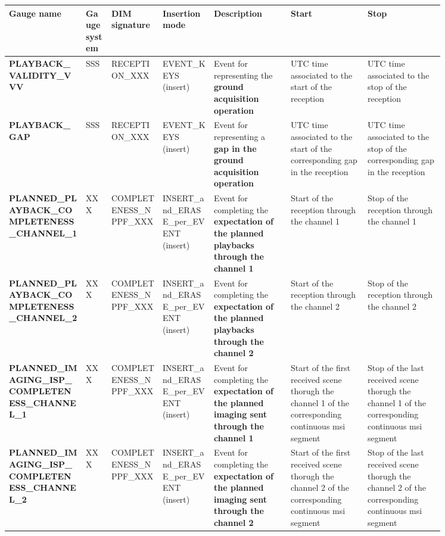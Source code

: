 \begin{landscape}
\begin{longtable}{|M{0.15\linewidth}|M{0.05\linewidth}|M{0.10\linewidth}|M{0.10\linewidth}|M{0.15\linewidth}|M{0.15\linewidth}|M{0.15\linewidth}|}
\hline \textbf{Gauge name} & \textbf{Gauge system} & \textbf{DIM signature} & \textbf{Insertion mode} & \textbf{Description} & \textbf{Start} & \textbf{Stop} \\ \hline
\textbf{PLAYBACK\_VALIDITY\_VVV} & SSS & \- RECEPTION\_XXX & EVENT\_KEYS (insert) & Event for representing the \textbf{ground acquisition operation} & UTC time associated to the start of the reception & UTC time associated to the stop of the reception \\ \hline
\textbf{PLAYBACK\_GAP} & SSS & \- RECEPTION\_XXX & EVENT\_KEYS (insert) & Event for representing a \textbf{gap in the ground acquisition operation} & UTC time associated to the start of the corresponding gap in the reception & UTC time associated to the stop of the corresponding gap in the reception \\ \hline
\textbf{PLANNED\_PLAYBACK\_COMPLETENESS\_CHANNEL\_1} & XXX & \- COMPLETENESS\_NPPF\_XXX & INSERT\_and\_ERASE\_per\_EVENT (insert) & Event for completing the \textbf{expectation of the planned playbacks through the channel 1} & Start of the reception through the channel 1 & Stop of the reception through the channel 1 \\ \hline
\textbf{PLANNED\_PLAYBACK\_COMPLETENESS\_CHANNEL\_2} & XXX & \- COMPLETENESS\_NPPF\_XXX & INSERT\_and\_ERASE\_per\_EVENT (insert) & Event for completing the \textbf{expectation of the planned playbacks through the channel 2} & Start of the reception through the channel 2 & Stop of the reception through the channel 2 \\ \hline
\textbf{PLANNED\_IMAGING\_ISP\_COMPLETENESS\_CHANNEL\_1} & XXX & \- COMPLETENESS\_NPPF\_XXX & INSERT\_and\_ERASE\_per\_EVENT (insert) & Event for completing the \textbf{expectation of the planned imaging sent through the channel 1} & Start of the first received scene thorugh the channel 1 of the corresponding continuous \acrshort{msi} segment & Stop of the last received scene thorugh the channel 1 of the corresponding continuous \acrshort{msi} segment \\ \hline
\textbf{PLANNED\_IMAGING\_ISP\_COMPLETENESS\_CHANNEL\_2} & XXX & \- COMPLETENESS\_NPPF\_XXX & INSERT\_and\_ERASE\_per\_EVENT (insert) & Event for completing the \textbf{expectation of the planned imaging sent through the channel 2} & Start of the first received scene thorugh the channel 2 of the corresponding continuous \acrshort{msi} segment & Stop of the last received scene thorugh the channel 2 of the corresponding continuous \acrshort{msi} segment \\ \hline

\end{longtable}
\end{landscape}
